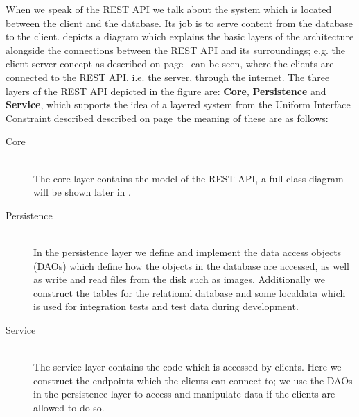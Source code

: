 When we speak of the REST API we talk about the system which is located between the client and the database.
Its job is to serve content from the database to the client.
 depicts a diagram which explains the basic layers of the architecture alongside the connections between the REST API and its surroundings; e.g. the client-server concept as described on page~\pageref{client-server-rest} can be seen, where the clients are connected to the REST API, i.e. the server, through the internet.
The three layers of the REST API depicted in the figure are: \textbf{Core}, \textbf{Persistence} and \textbf{Service}, which supports the idea of a layered system from the Uniform Interface Constraint described described on page~\pageref{layeredsystem}the meaning of these are as follows:
\begin{description}
    \item[Core] \hfill \\
    The core layer contains the model of the REST API, a full class diagram will be shown later in .

    \item[Persistence] \hfill \\
    In the persistence layer we define and implement the data access objects (DAOs) which define how the objects in the database are accessed, as well as write and read files from the disk such as images.
    Additionally we construct the tables for the relational database and some localdata which is used for integration tests and test data during development.

    \item[Service] \hfill \\
    The service layer contains the code which is accessed by clients. 
    Here we construct the endpoints which the clients can connect to; we use the DAOs in the persistence layer to access and manipulate data if the clients are allowed to do so. 
\end{description}

